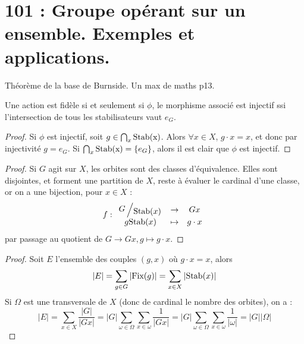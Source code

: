 \newpage

\section{101 : Groupe opérant sur un ensemble. Exemples et applications.}


\begin{developpements}
	\item Théorème de la base de Burnside. Un max de maths p13.
\end{developpements}
 

\Prop
{
	Une action est fidèle si et seulement si $\phi$, le morphisme associé est injectif ssi l'intersection de tous les stabilisateurs vaut $e_G$.
}


\begin{proof}
	Si $\phi$ est injectif, soit $g\in  \bigcap_x \textup{Stab(x)}$. Alors $\forall x \in X$, $g\cdot x = x$, et donc par injectivité $g = e_G$. Si $\bigcap_x \textup{Stab(x)} = \{e_G\}$, alors il est clair que $\phi$ est injectif.
\end{proof}



\begin{proof}
	Si $G$ agit sur $X$, les orbites sont des classes d'équivalence. Elles sont disjointes, et forment une partition de $X$, reste à évaluer le cardinal d'une classe, or on a une bijection, pour $x \in X$ :
	\[
		f : \begin{array}{cccc} \bigslant{G}{\textup{Stab}(x)} & \to & G x\\ g \textup{Stab}(x) & \mapsto & g\cdot x\end{array}
	\]
	par passage au quotient de $G \to Gx,g \mapsto g \cdot x$.
\end{proof}



\begin{proof}
	Soit $E$ l'ensemble des couples $(g,x)$ où $g\cdot x = x$, alors
	\[
		\vert E \vert = \sum_{g \in G}\vert \textup{Fix}(g)\vert = \sum_{x\in X} \vert \textup{Stab}(x) \vert
	\]
	Si $\Omega$ est une transversale de $X$ (donc de cardinal le nombre des orbites), on a :
	\[ 
		\vert E \vert = \sum_{x \in X} \frac{\vert G\vert}{\vert Gx\vert } = \vert G \vert \sum_{ \omega \in \Omega}  \sum_{ x \in \omega} 	\frac{1}{\vert Gx\vert} = \vert G \vert \sum_{ \omega \in \Omega}  \sum_{ x \in \omega} \frac{1}{\vert \omega\vert}  = \vert G  \vert \vert \Omega \vert 
	\]
\end{proof}


